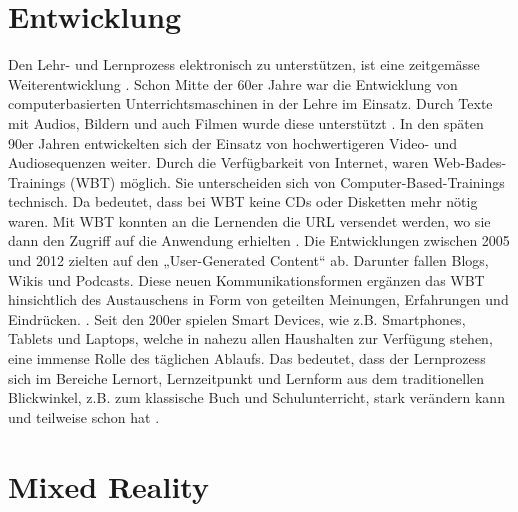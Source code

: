 \section{Entwicklung}
Den Lehr- und Lernprozess elektronisch zu unterstützen, ist eine zeitgemässe Weiterentwicklung \cite[vgl.][S.5]{Dittler}. Schon Mitte der 60er Jahre war die Entwicklung von computerbasierten Unterrichtsmaschinen in der Lehre im Einsatz. Durch Texte mit Audios, Bildern und auch Filmen wurde diese unterstützt \cite[vgl.][S.12]{Dittler}. In den späten 90er Jahren entwickelten sich der Einsatz von hochwertigeren Video- und Audiosequenzen weiter. Durch die Verfügbarkeit von Internet, waren Web-Bades-Trainings (WBT) möglich. Sie unterscheiden sich von Computer-Based-Trainings technisch. Da bedeutet, dass bei WBT keine CDs oder Disketten mehr nötig waren. Mit WBT konnten an die Lernenden die URL versendet werden, wo sie dann den Zugriff auf die Anwendung erhielten \cite[vgl.][S.23]{Dittler}. Die Entwicklungen zwischen 2005 und 2012 zielten auf den „User-Generated Content“ ab. Darunter fallen Blogs, Wikis und Podcasts. Diese neuen Kommunikationsformen ergänzen das WBT hinsichtlich des Austauschens in Form von geteilten Meinungen, Erfahrungen und Eindrücken. \cite[vgl.][S.31]{Dittler}. Seit den 200er spielen Smart Devices, wie z.B. Smartphones, Tablets und Laptops, welche in nahezu allen Haushalten zur Verfügung stehen, eine immense Rolle des täglichen Ablaufs. Das bedeutet, dass der Lernprozess sich im Bereiche Lernort, Lernzeitpunkt und Lernform aus dem traditionellen Blickwinkel, z.B. zum klassische Buch und Schulunterricht, stark verändern kann und teilweise schon hat \cite[vgl.][S.51]{Dittler}. 

\section{Mixed Reality}

